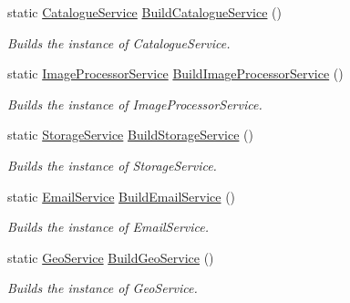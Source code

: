 \begin{DoxyCompactItemize}
static \hyperlink{classcom_1_1shephertz_1_1app42_1_1paas_1_1sdk_1_1csharp_1_1shopping_1_1_catalogue_service}{Catalogue\+Service} \hyperlink{classcom_1_1shephertz_1_1app42_1_1paas_1_1sdk_1_1csharp_1_1_app42_a_p_i_a3add703c331b984af7ef40e1e99f0b22}{Build\+Catalogue\+Service} ()
\begin{DoxyCompactList}\small\item\em Builds the instance of Catalogue\+Service. \end{DoxyCompactList}\item 
static \hyperlink{classcom_1_1shephertz_1_1app42_1_1paas_1_1sdk_1_1csharp_1_1image_processor_1_1_image_processor_service}{Image\+Processor\+Service} \hyperlink{classcom_1_1shephertz_1_1app42_1_1paas_1_1sdk_1_1csharp_1_1_app42_a_p_i_a03454d01764adcd720fcaa9fafc68124}{Build\+Image\+Processor\+Service} ()
\begin{DoxyCompactList}\small\item\em Builds the instance of Image\+Processor\+Service. \end{DoxyCompactList}\item 
static \hyperlink{classcom_1_1shephertz_1_1app42_1_1paas_1_1sdk_1_1csharp_1_1storage_1_1_storage_service}{Storage\+Service} \hyperlink{classcom_1_1shephertz_1_1app42_1_1paas_1_1sdk_1_1csharp_1_1_app42_a_p_i_a1c4426649fed169304cfb1de98571dce}{Build\+Storage\+Service} ()
\begin{DoxyCompactList}\small\item\em Builds the instance of Storage\+Service. \end{DoxyCompactList}\item 
static \hyperlink{classcom_1_1shephertz_1_1app42_1_1paas_1_1sdk_1_1csharp_1_1email_1_1_email_service}{Email\+Service} \hyperlink{classcom_1_1shephertz_1_1app42_1_1paas_1_1sdk_1_1csharp_1_1_app42_a_p_i_afcd3b031a3bb02ae7923d1fbf2e08371}{Build\+Email\+Service} ()
\begin{DoxyCompactList}\small\item\em Builds the instance of Email\+Service. \end{DoxyCompactList}\item 
static \hyperlink{classcom_1_1shephertz_1_1app42_1_1paas_1_1sdk_1_1csharp_1_1geo_1_1_geo_service}{Geo\+Service} \hyperlink{classcom_1_1shephertz_1_1app42_1_1paas_1_1sdk_1_1csharp_1_1_app42_a_p_i_a4326659a56130be124ca8b3d303d8f3f}{Build\+Geo\+Service} ()
\begin{DoxyCompactList}\small\item\em Builds the instance of Geo\+Service. \end{DoxyCompactList}\item 

\end{DoxyCompactItemize}
